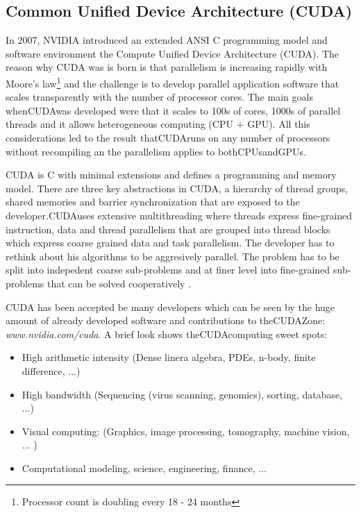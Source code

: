 \subsection*{Common Unified Device Architecture (CUDA)} %
\label{sub:common_unified_device_architecture_cuda_}
In 2007, NVIDIA introduced an extended ANSI C programming model and software
environment the Compute Unified Device Architecture (CUDA). The reason why CUDA
was is born is that parallelism is increasing rapidly with Moore's
law\footnote{Processor count is doubling every 18 - 24 months} and the challenge
is to develop parallel application software that scales transparently with the
number of processor cores. The main goals when\gls{CUDA}was developed were that it
scales to 100s of cores, 1000s of parallel threads and it allows heterogeneous
computing (CPU + GPU). All this considerations led to the result that\gls{CUDA}runs
on any number of processors without recompiling an the parallelism applies to
both\glspl{CPU}and\glspl{GPU}\citep{citeulike:3839013}.

CUDA is C with minimal extensions and defines a programming and memory model.
There are three key abstractions in CUDA, a hierarchy of thread groups, shared
memories and barrier synchronization \citep{citeulike:3325943} that are exposed
to the developer.\gls{CUDA}uses extensive multithreading where threads express
fine-grained instruction, data and thread parallelism that are grouped into
thread blocks which express coarse grained data and task parallelism. The
developer has to rethink about his algorithms to be aggresively parallel.
The problem has to be split into indepedent coarse sub-problems and at finer
level into fine-grained sub-problems that can be solved cooperatively
\citep{citeulike:3325943}.

CUDA has been accepted be many developers which can be seen by the huge amount
of already developed software and contributions to the\gls{CUDA}Zone:
\emph{www.nvidia.com/cuda}. A brief look shows the\gls{CUDA}computing sweet 
spots\citep{citeulike:3839013}: 
\begin{itemize} 
	\item High arithmetic intensity (Dense linera algebra, PDEs, n-body, 
			finite difference, ...) 
	\item High bandwidth (Sequencing (virus scanning, genomics), sorting, 			
			database, ...) 
	\item Visual computing: (Graphics, image processing, tomography, 
			machine vision, ... ) 
	\item Computational modeling, science, engineering, finance, ... 			
\end{itemize}


